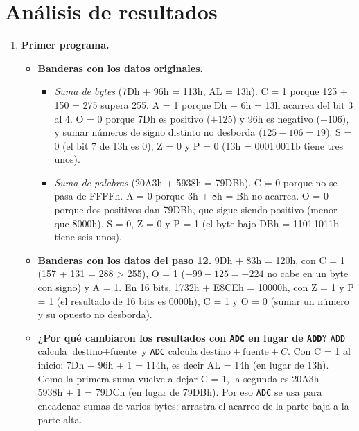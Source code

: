 \documentclass[10pt]{article}
\begin{document}
\section{Análisis de resultados}
 
\begin{enumerate}
  \renewcommand{\labelenumi}{\alph{enumi})}
 
  \item \textbf{Primer programa.}
  \begin{itemize}
    \item \textbf{Banderas con los datos originales.}
    \begin{itemize}
      \item \textit{Suma de bytes} (7Dh + 96h = 113h, AL = 13h). C = 1 porque 125 + 150 = 275 supera 255. A = 1 porque Dh + 6h = 13h acarrea del bit 3 al 4. O = 0 porque 7Dh es positivo ($+125$) y 96h es negativo ($-106$), y sumar números de signo distinto no desborda ($125 - 106 = 19$). S = 0 (el bit 7 de 13h es 0), Z = 0 y P = 0 (13h = 0001\,0011b tiene tres unos).
      \item \textit{Suma de palabras} (20A3h + 5938h = 79DBh). C = 0 porque no se pasa de FFFFh. A = 0 porque 3h + 8h = Bh no acarrea. O = 0 porque dos positivos dan 79DBh, que sigue siendo positivo (menor que 8000h). S = 0, Z = 0 y P = 1 (el byte bajo DBh = 1101\,1011b tiene seis unos).
    \end{itemize}
    \item \textbf{Banderas con los datos del paso 12.} 9Dh + 83h = 120h, con C = 1 (157 + 131 = 288 > 255), O = 1 ($-99 - 125 = -224$ no cabe en un byte con signo) y A = 1. En 16 bits, 1732h + E8CEh = 10000h, con Z = 1 y P = 1 (el resultado de 16 bits es 0000h), C = 1 y O = 0 (sumar un número y su opuesto no desborda).
    \item \textbf{¿Por qué cambiaron los resultados con \texttt{ADC} en lugar de \texttt{ADD}?} \texttt{ADD} calcula $\text{destino} + \text{fuente}$ y \texttt{ADC} calcula $\text{destino} + \text{fuente} + C$. Con C = 1 al inicio: 7Dh + 96h + 1 = 114h, es decir AL = 14h (en lugar de 13h). Como la primera suma vuelve a dejar C = 1, la segunda es 20A3h + 5938h + 1 = 79DCh (en lugar de 79DBh). Por eso \texttt{ADC} se usa para encadenar sumas de varios bytes: arrastra el acarreo de la parte baja a la parte alta.
  \end{itemize}
 

\end{enumerate}
\end{document}

